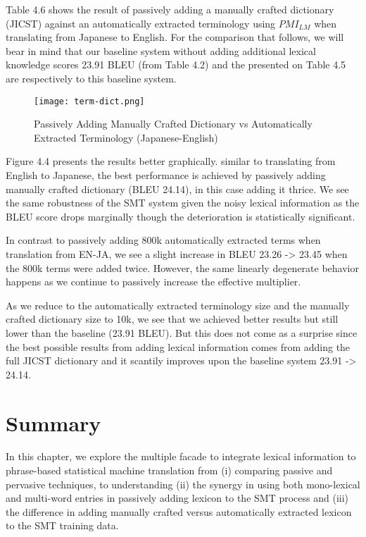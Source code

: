 Table 4.6 shows the result of passively adding a manually crafted dictionary (JICST) against an automatically extracted terminology using $PMI_{LM}$ when translating from Japanese to English. For the comparison that follows, we will bear in mind that our baseline system without adding additional lexical knowledge scores 23.91 BLEU (from Table 4.2) and the presented on Table 4.5 are respectively to this baseline system.

\vspace{-5mm}
\begin{figure}[!htb]
\centering
	\hspace{-2em}%
	\texttt{[image: term-dict.png]} \\[-1em]
	\caption{Passively Adding Manually Crafted Dictionary vs Automatically Extracted Terminology (Japanese-English)}
	\label{fig-manvauto}
\end{figure}

Figure 4.4 presents the results better graphically. similar to translating from English to Japanese, the best performance is achieved by passively adding manually crafted dictionary (BLEU 24.14), in this case adding it thrice. We see the same robustness of the SMT system given the noisy lexical information as the BLEU score drops marginally though the deterioration is statistically significant. 

In contrast to passively adding 800k automatically extracted terms  when translation from EN-JA, we see a slight increase in BLEU 23.26 -> 23.45  when the 800k terms were added twice. However, the same linearly degenerate behavior happens as we continue to passively increase the effective multiplier. 

As we reduce to the automatically extracted terminology size and the manually crafted dictionary size to 10k, we see that we achieved better results but still lower than the baseline (23.91 BLEU). But this does not come as a surprise since the best possible results from adding lexical information comes from adding the full JICST dictionary and it scantily improves upon the baseline system 23.91 -> 24.14.

\section{Summary}

In this chapter, we explore the multiple facade to integrate lexical information to phrase-based statistical machine translation  from (i) comparing passive and pervasive techniques, to understanding (ii) the synergy in using both mono-lexical and multi-word entries in passively adding lexicon to the SMT process and (iii) the difference in adding manually crafted versus automatically extracted lexicon to the SMT training data. 

